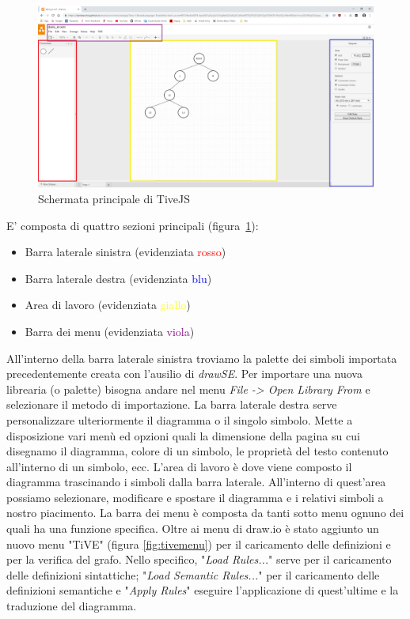             \begin{figure}[htbp]
                \centering
                \includegraphics[scale=0.25]{Figure/tivejs_gui2.png}
                \caption{Schermata principale di TiveJS}
                \label{fig:tivejsgui}
            \end{figure}

            E' composta di quattro sezioni principali (figura~\ref{fig:tivejsgui}):
            \begin{itemize}
                \item Barra laterale sinistra (evidenziata \textcolor{red}{rosso})
                \item Barra laterale destra (evidenziata \textcolor{blue}{blu})
                \item Area di lavoro (evidenziata \textcolor{yellow}{giallo})
                \item Barra dei menu (evidenziata \textcolor{purple}{viola})
            \end{itemize}
            All'interno della barra laterale sinistra troviamo la palette dei simboli importata precedentemente creata con l'ausilio di \textit{drawSE}. Per importare una nuova librearia (o palette) bisogna andare nel menu \textit{File -> Open Library From} e selezionare il metodo di importazione.
            \newline
            La barra laterale destra serve personalizzare ulteriormente il diagramma o il singolo simbolo. Mette a disposizione vari menù ed opzioni quali la dimensione della pagina su cui disegnamo il diagramma, colore di un simbolo, le proprietà del testo contenuto all'interno di un simbolo, ecc. 
            \newline
            L'area di lavoro è dove viene composto il diagramma trascinando i simboli dalla barra laterale. All'interno di quest'area possiamo selezionare, modificare e spostare il diagramma e i relativi simboli a nostro piacimento.
            \newline
            La barra dei menu è composta da tanti sotto menu ognuno dei quali ha una funzione specifica. Oltre ai menu di draw.io è stato aggiunto un nuovo menu "TiVE" (figura \ref{fig:tivemenu}) per il caricamento delle definizioni e per la verifica del grafo. Nello specifico, "\textit{Load Rules...}" serve per il caricamento delle definizioni sintattiche; "\textit{Load Semantic Rules...}" per il caricamento delle definizioni semantiche e "\textit{Apply Rules}" eseguire l'applicazione di quest'ultime e la traduzione del diagramma.
            
